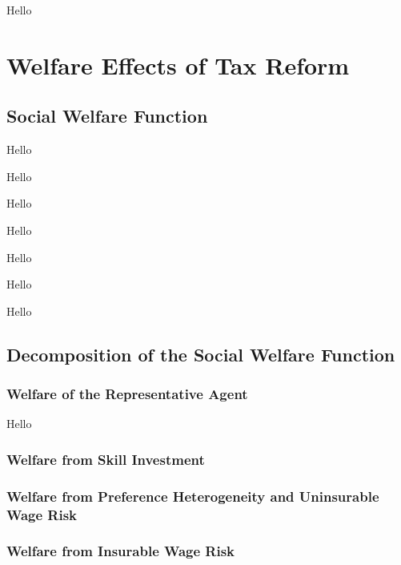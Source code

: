 \documentclass{article}
\begin{document}
{
\proposition Hello

}

\section{Welfare Effects of Tax Reform}



\subsection{Social Welfare Function}



{
\proposition Hello

}

{
\corollary Hello

}

{
\corollary Hello

}

{
\corollary Hello

}

{
\corollary Hello

}

{
\corollary Hello

}

{
\corollary Hello

}

\subsection{Decomposition of the Social Welfare Function}

\subsubsection{Welfare of the Representative Agent}

{
\proposition Hello

}

\subsubsection{Welfare from Skill Investment}

\subsubsection{Welfare from Preference Heterogeneity and Uninsurable Wage Risk}

\subsubsection{Welfare from Insurable Wage Risk}
\end{document}
